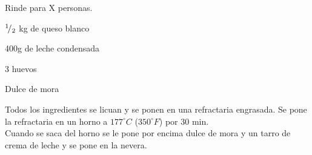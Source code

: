 
Rinde para X personas.

\begin{ingredientes}
\item ${}^{1}\!/_{2}$ kg de queso blanco
\item 400g de leche condensada
\item 3 huevos
\item Dulce de mora
\end{ingredientes}
\preparacion
Todos los ingredientes se licuan y se ponen en una refractaria engrasada. Se pone la refractaria en un horno a $177^{\circ}C$ ($350^{\circ}F$) por 30 min.\\

Cuando se saca del horno se le pone por encima dulce de mora y un tarro de crema de leche y se pone en la nevera.